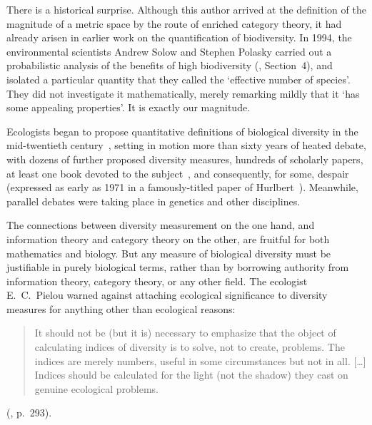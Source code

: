 There is a historical surprise.  Although this author arrived at the
definition of the magnitude of a metric space by the route of enriched
category theory, it had already arisen in earlier work on the
quantification of biodiversity.  In 1994, the environmental scientists
Andrew Solow%
%
%
and Stephen\label{p:sp-mag} Polasky%
%
%
carried out a probabilistic analysis of the benefits of high biodiversity
(\cite{SoPo}, Section~4), and isolated a particular quantity that they
called the `effective%
%
% 
number of species'.  They did not
investigate it mathematically, merely remarking mildly that it `has
some appealing properties'.  It is exactly our magnitude.

\introbreak

Ecologists began to propose quantitative definitions of biological
diversity in the mid-twentieth century~\cite{SimpMD,WhitVSM}, setting in
motion more than sixty years of heated debate, with dozens of further proposed
diversity measures, hundreds of scholarly papers, at least one book devoted
to the subject~\cite{Magu}, and consequently, for some, despair (expressed
as early as 1971 in a famously-titled paper of Hurlbert~\cite{Hurl}).%
%
% 
Meanwhile, parallel debates were taking place in genetics and other
disciplines.

The connections between diversity measurement on the one hand, and
information theory and category theory on the other, are fruitful for both
mathematics and biology.  But any measure of biological diversity must be
justifiable in purely biological terms, rather than by borrowing authority
from information theory, category theory, or any other field.  The
ecologist E.~C.~Pielou%
% 
% 
warned against attaching ecological significance to diversity measures for
anything other than ecological reasons:
% 
\begin{quote}
It should not be (but it is) necessary to emphasize that the object of
calculating indices of diversity is to solve, not to create, problems.  The
indices are merely numbers, useful in some circumstances but not in all.
[\ldots] Indices should be calculated for the light (not the shadow) they
cast on genuine ecological problems.
\end{quote}
% 
(\cite{PielME}, p.~293).

